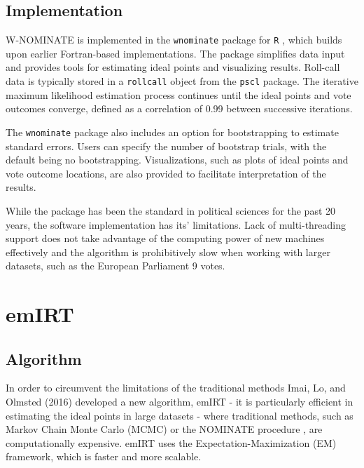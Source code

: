 \documentclass{report}
\begin{document}
    \subsection{Implementation}
    W-NOMINATE is implemented in the \texttt{wnominate} package for \texttt{R}
    , which builds upon earlier Fortran-based implementations. The package simplifies data input and
    provides tools for estimating ideal points and visualizing results. Roll-call data is typically
    stored in a \texttt{rollcall} object from the \texttt{pscl}
    package. The iterative maximum likelihood estimation process continues until the ideal points
    and vote outcomes converge, defined as a correlation of 0.99 between successive iterations.

    The \texttt{wnominate}
    package also includes an option for bootstrapping to estimate standard errors. Users can specify
    the number of bootstrap trials, with the default being no bootstrapping. Visualizations, such as
    plots of ideal points and vote outcome locations, are also provided to facilitate interpretation
    of the results.

    While the package has been the standard in political sciences for the past 20 years, the software
    implementation has its' limitations. Lack of multi-threading support does not take advantage of the
    computing power of new machines effectively and the algorithm is prohibitively slow when working
    with larger datasets, such as the European Parliament 9 votes.


    \section{emIRT}

    \subsection{Algorithm}
    In order to circumvent the limitations of the traditional methods Imai, Lo, and Olmsted (2016) developed a
    new algorithm, emIRT - it is particularly efficient in estimating the ideal points in large datasets - where
    traditional methods, such as Markov Chain Monte Carlo
    (MCMC) or the NOMINATE procedure , are computationally expensive. emIRT uses the
    Expectation-Maximization (EM) framework, which is faster and more scalable.
\end{document}
